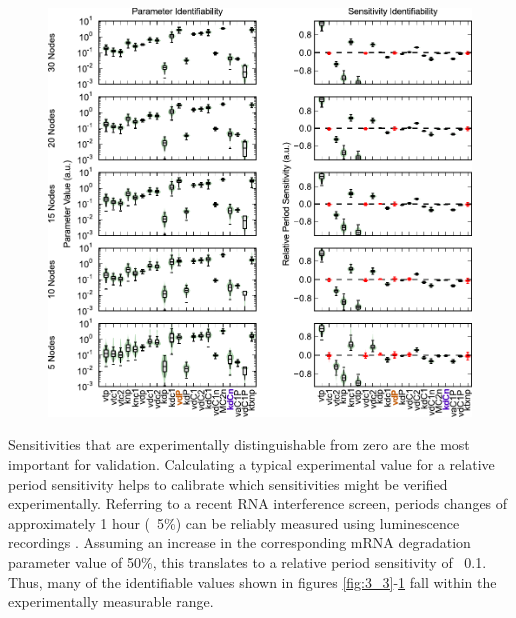 {\begin{figure}[p]
  \centering
  \includegraphics{chap3/figures/fig4.pdf}
  \label{fig:3_4}
\end{figure}

Sensitivities that are experimentally distinguishable from zero are the most important for validation. 
Calculating a typical experimental value for a relative period sensitivity helps to calibrate which sensitivities might be verified experimentally. 
Referring to a recent RNA interference screen, periods changes of approximately 1 hour (~5\%) can be reliably measured using luminescence recordings \cite{Zhang2009}. 
Assuming an increase in the corresponding mRNA degradation parameter value of 50\%, this translates to a relative period sensitivity of ~0.1. 
Thus, many of the identifiable values shown in figures \ref{fig:3_3}-\ref{fig:3_4} fall within the experimentally measurable range. 

}
